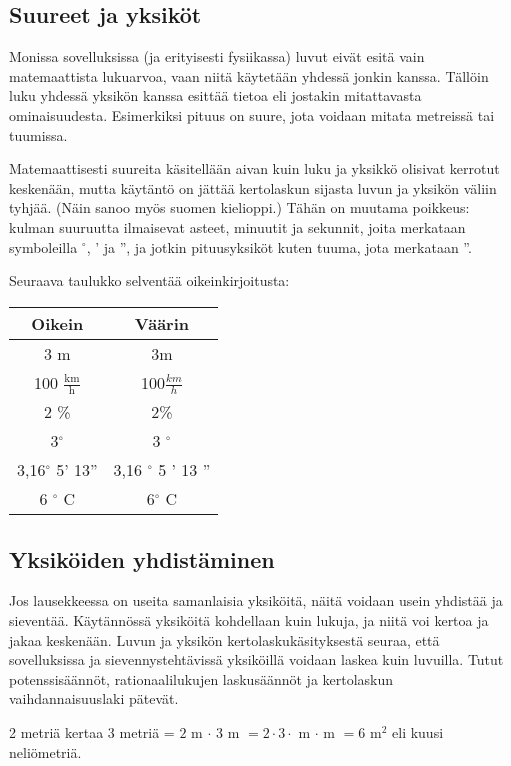 \subsection*{Suureet ja yksiköt}


Monissa sovelluksissa (ja erityisesti fysiikassa) luvut eivät esitä vain matemaattista lukuarvoa, vaan niitä käytetään yhdessä jonkin  kanssa.
Tällöin luku yhdessä yksikön kanssa esittää tietoa  eli jostakin mitattavasta ominaisuudesta.
Esimerkiksi pituus on suure, jota voidaan mitata metreissä tai tuumissa.


Matemaattisesti suureita käsitellään aivan kuin luku ja yksikkö olisivat kerrotut keskenään, mutta käytäntö on jättää kertolaskun sijasta luvun ja yksikön väliin tyhjää.
(Näin sanoo myös suomen kielioppi.) Tähän on muutama poikkeus: kulman suuruutta ilmaisevat asteet, minuutit ja sekunnit, joita merkataan symboleilla $^\circ$, ' ja '', ja jotkin pituusyksiköt kuten tuuma, jota merkataan ''.

Seuraava taulukko selventää oikeinkirjoitusta:

\begin{tabular}{c|c}
Oikein & Väärin \\
\hline
3 m & 3m 	\\
100 $\frac{\text{km}}{\text{h}}$ & 100$\frac{km}{h}$	\\
2 \% & 2\% 	\\
3$^\circ$ & 3 $^\circ$\\
3,16$^\circ$ 5' 13'' & 3,16 $^\circ$ 5 ' 13 '' 	\\
6 $^\circ$ C & 6$^\circ$ C 	\\
\end{tabular}

\subsection*{Yksiköiden yhdistäminen}

Jos lausekkeessa on useita samanlaisia yksiköitä, näitä voidaan usein yhdistää ja sieventää. Käytännössä yksiköitä kohdellaan kuin lukuja, ja niitä voi kertoa ja jakaa keskenään.
Luvun ja yksikön kertolaskukäsityksestä seuraa, että sovelluksissa ja sievennystehtävissä yksiköillä voidaan laskea kuin luvuilla.
Tutut potenssisäännöt, rationaalilukujen laskusäännöt ja kertolaskun vaihdannaisuuslaki pätevät.

\begin{esimerkki}
2 metriä kertaa 3 metriä = $2$ m $\cdot$ $3$ m $=2 \cdot 3 \cdot$ m $\cdot$ m $=6 $ m$^2$ eli kuusi neliömetriä.
\end{esimerkki}

